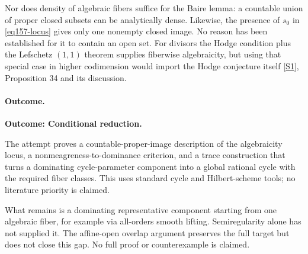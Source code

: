 \documentclass[11pt,a4paper]{article}
\newcommand{\sref}[2]{\hyperlink{source:#1:#2}{[S#2]}}
\numberwithin{equation}{section}
\begin{document}
Nor does density of algebraic fibers suffice for the Baire lemma: a
countable union of proper closed subsets can be analytically dense.
Likewise, the presence of $s_0$ in \eqref{eq157-locus} gives only one
nonempty closed image. No reason has been established for it to contain
an open set. For divisors the Hodge condition plus the Lefschetz
$(1,1)$ theorem supplies fiberwise algebraicity, but using that special
case in higher codimension would import the Hodge conjecture itself
\sref{30006758}{1}, Proposition 34 and its discussion.

\paragraph{Outcome.}
\textbf{Outcome: Conditional reduction.}

The attempt proves a countable-proper-image description of the algebraicity
locus, a nonmeagreness-to-dominance criterion, and a trace construction that
turns a dominating cycle-parameter component into a global rational cycle
with the required fiber classes. This uses standard cycle and Hilbert-scheme
tools; no literature priority is claimed.

What remains is a dominating representative component starting from one
algebraic fiber, for example via all-orders smooth lifting. Semiregularity
alone has not supplied it. The affine-open overlap argument preserves the
full target but does not close this gap. No full proof or counterexample
is claimed.
\end{document}
